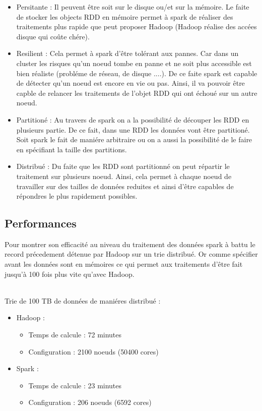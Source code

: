 \begin{itemize}
	\item Persitante : Il peuvent être soit sur le disque ou/et sur la mémoire. Le faite de stocker les objects RDD en mémoire permet à spark de réaliser des traitements plus rapide que peut proposer Hadoop (Hadoop réalise des accées disque qui coûte chére).
	\item Resilient : Cela permet à spark d'être tolérant aux pannes. Car dans un cluster les risques qu'un noeud tombe en panne et ne soit plus accessible est bien réaliste (probléme de réseau, de disque ....). De ce faite spark est capable de détecter qu'un noeud est encore en vie ou pas. Ainsi, il va pouvoir être capble de relancer les traitements de l'objet RDD qui ont échoué sur un autre noeud.
	\item Partitioné : Au travers de spark on a la possibilité de découper les RDD en plusieurs partie. De ce fait, dans une RDD les données vont être partitioné. Soit spark le fait de maniére arbitraire ou on a aussi la possibilité de le faire en spécifiant la taille des partitions.
	\item Distribué : Du faite que les RDD sont partitionné on peut répartir le traitement sur plusieurs noeud. Ainsi, cela permet à chaque noeud de travailler sur des tailles de données reduites et ainsi d'être capables de répondres le plus rapidement possibles.
\end{itemize}

\subsection{Performances}

Pour montrer son efficacité au niveau du traitement des données spark à battu le record précedement détenue par Hadoop sur un trie distribué. Or comme spécifier avant les données sont en mémoires ce qui permet aux traitements d'être fait jusqu'à 100 fois plus vite qu'avec Hadoop.

\ \\
Trie de 100 TB de données de maniéres distribué :
\ \\
\begin{itemize}
	\item Hadoop :
        \begin{itemize}
            \item Temps de calcule : 72 minutes
            \item Configuration : 2100 noeuds (50400 cores)
        \end{itemize}
	\item Spark :
		\begin{itemize}
        	\item Temps de calcule : 23 minutes
        	\item Configuration : 206 noeuds (6592 cores)
        \end{itemize}
\end{itemize}

